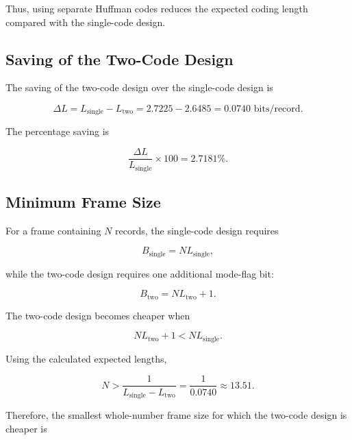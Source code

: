\documentclass[11pt,a4paper]{article}
\begin{document}
Thus, using separate Huffman codes reduces the expected coding length
compared with the single-code design.

\subsection{Saving of the Two-Code Design}

The saving of the two-code design over the single-code design is

\begin{equation}
    \Delta L
    = L_{\mathrm{single}}-L_{\mathrm{two}}
    = 2.7225-2.6485
    = \boxed{0.0740\text{ bits/record}}.
\end{equation}

The percentage saving is

\begin{equation}
    \frac{\Delta L}{L_{\mathrm{single}}}\times100
    = \boxed{2.7181\%}.
\end{equation}

\subsection{Minimum Frame Size}

For a frame containing \(N\) records, the single-code design requires

\begin{equation}
    B_{\mathrm{single}} = NL_{\mathrm{single}},
\end{equation}

while the two-code design requires one additional mode-flag bit:

\begin{equation}
    B_{\mathrm{two}} = NL_{\mathrm{two}}+1.
\end{equation}

The two-code design becomes cheaper when

\begin{equation}
    NL_{\mathrm{two}}+1 < NL_{\mathrm{single}}.
\end{equation}

Using the calculated expected lengths,

\begin{equation}
    N > \frac{1}{L_{\mathrm{single}}-L_{\mathrm{two}}}
    = \frac{1}{0.0740}
    \approx 13.51.
\end{equation}

Therefore, the smallest whole-number frame size for which the
two-code design is cheaper is
\end{document}
